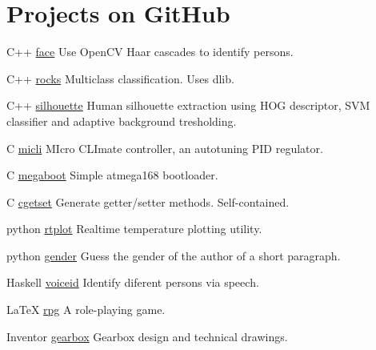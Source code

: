 \documentclass{tccv}
\begin{document}
\section{Projects on GitHub}
\begin{yearlist}
\item{C++}
     {\href{https://github.com/MiroslavVitkov/face}{face}}
     {Use OpenCV Haar cascades to identify persons. }

\item{C++}
     {\href{https://github.com/MiroslavVitkov/rocks}{rocks}}
     {Multiclass classification. Uses dlib.}

\item{C++}
     {\href{https://github.com/MiroslavVitkov/silhouette}{silhouette}}
     {Human silhouette extraction using HOG descriptor, SVM classifier and adaptive background tresholding.}

\item{C}
     {\href{https://github.com/MiroslavVitkov/micli}{micli}}
     {MIcro CLImate controller, an autotuning PID regulator.}

\item{C}
     {\href{https://github.com/MiroslavVitkov/megaboot}{megaboot}}
     {Simple atmega168 bootloader.}

\item{C}
     {\href{https://github.com/MiroslavVitkov/cgetset}{cgetset}}
     {Generate getter/setter methods. Self-contained.}

\item{python}
     {\href{https://github.com/MiroslavVitkov/rtplot}{rtplot}}
     {Realtime temperature plotting utility.}


\item{python}
     {\href{https://github.com/MiroslavVitkov/gender}{gender}}
     {Guess the gender of the author of a short paragraph.}


\item{Haskell}
     {\href{https://github.com/MiroslavVitkov/voiceid}{voiceid}}
     {Identify diferent persons via speech.}

\item{LaTeX}
     {\href{https://github.com/MiroslavVitkov/rpg}{rpg}}
     {A role-playing game.}

\item{Inventor}
     {\href{https://github.com/MiroslavVitkov/gearbox}{gearbox}}
     {Gearbox design and technical drawings.}
\end{yearlist}
\end{document}
